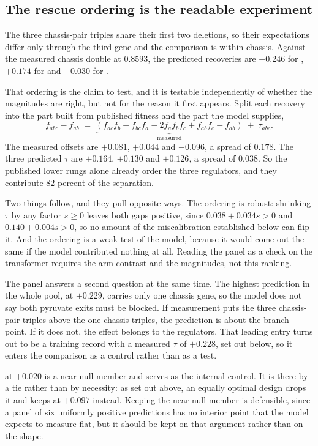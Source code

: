 \subsection{The rescue ordering is the readable experiment}

The three chassis-pair triples share their first two deletions, so their
expectations differ only through the third gene and the comparison is
within-chassis. Against the measured chassis double at $0.8593$, the predicted
recoveries are $+0.246$ for , $+0.174$ for  and $+0.030$
for .

That ordering is the claim to test, and it is testable independently of whether
the magnitudes are right, but not for the reason it first appears. Split each
recovery into the part built from published fitness and the part the model
supplies,
\[
  f_{abc} - f_{ab} \;=\; \underbrace{(f_{ac}f_b + f_{bc}f_a - 2f_af_bf_c
  + f_{ab}f_c - f_{ab})}_{\text{measured}} \;+\; \tau_{abc}.
\]
The measured offsets are $+0.081$, $+0.044$ and $-0.096$, a spread of $0.178$.
The three predicted $\tau$ are $+0.164$, $+0.130$ and $+0.126$, a spread of
$0.038$. So the published lower rungs alone already order the three regulators,
and they contribute $82$ percent of the separation.

Two things follow, and they pull opposite ways. The ordering is robust: shrinking
$\tau$ by any factor $s \ge 0$ leaves both gaps positive, since
$0.038 + 0.034s > 0$ and $0.140 + 0.004s > 0$, so no amount of the miscalibration
established below can flip it. And the ordering is a weak test of the model,
because it would come out the same if the model contributed nothing at all.
Reading the panel as a check on the transformer requires the arm contrast and the
magnitudes, not this ranking.

The panel answers a second question at the same time. The highest prediction in
the whole pool,    at $+0.229$, carries only one
chassis gene, so the model does not say both pyruvate exits must be blocked. If
measurement puts the three chassis-pair triples above the one-chassis triples, the
prediction is about the branch point. If it does not, the effect belongs to the
regulators. That leading entry turns out to be a training record with a measured
$\tau$ of $+0.228$, set out below, so it enters the comparison as a control rather
than as a test.

   at $+0.020$ is a near-null member and serves
as the internal control. It is there by a tie rather than by necessity: as set
out above, an equally optimal design drops it and keeps  
 at $+0.097$ instead. Keeping the near-null member is defensible,
since a panel of six uniformly positive predictions has no interior point that
the model expects to measure flat, but it should be kept on that argument rather
than on the shape.

